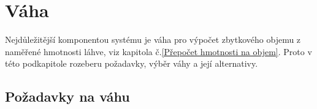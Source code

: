 \section{Váha}

Nejdůležitější komponentou systému je váha pro výpočet zbytkového objemu z naměřené hmotnosti láhve, viz kapitola č.\ref{Přepočet hmotnosti na objem}.  Proto v této podkapitole rozeberu požadavky, výběr váhy a její alternativy.
%
%
%
%
%
%
%
%
\subsection{Požadavky na váhu}


